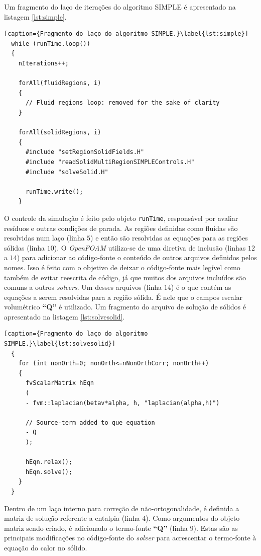Um fragmento do laço de iterações do algoritmo SIMPLE é apresentado na listagem \ref{lst:simple}.

\begin{lstlisting}[caption={Fragmento do laço do algoritmo SIMPLE.}\label{lst:simple}]
  while (runTime.loop())
  {
    nIterations++;

    forAll(fluidRegions, i)
    {
      // Fluid regions loop: removed for the sake of clarity
    }
    
    forAll(solidRegions, i)
    {
      #include "setRegionSolidFields.H"
      #include "readSolidMultiRegionSIMPLEControls.H"
      #include "solveSolid.H"
      
      runTime.write();
    }
\end{lstlisting}

O controle da simulação é feito pelo objeto \texttt{runTime}, responsável por avaliar resíduos
e outras condições de parada. As regiões definidas como fluidas são resolvidas num laço (linha $5$)
e então são resolvidas as equações para as regiões sólidas (linha $10$). O \textit{OpenFOAM} utiliza-se
de uma diretiva de inclusão (linhas $12$ a $14$) para adicionar ao código-fonte o conteúdo de outros
arquivos definidos pelos nomes. Isso é feito com o objetivo de deixar o código-fonte mais legível como
também de evitar reescrita de código, já que muitos dos arquivos incluídos são comuns a outros
\textit{solvers}. Um desses arquivos (linha $14$) é o que contém as equações a serem resolvidas para
a região sólida. É nele que o campos escalar volumétrico \textbf{``Q''} é utilizado. Um fragmento
do arquivo de solução de sólidos é apresentado na listagem \ref{lst:solvesolid}.

\begin{lstlisting}[caption={Fragmento do laço do algoritmo SIMPLE.}\label{lst:solvesolid}]
  {
    for (int nonOrth=0; nonOrth<=nNonOrthCorr; nonOrth++)
    {
      fvScalarMatrix hEqn
      (
      - fvm::laplacian(betav*alpha, h, "laplacian(alpha,h)")

      // Source-term added to que equation
      - Q
      );

      hEqn.relax();
      hEqn.solve();
    }
  }
\end{lstlisting}

Dentro de um laço interno para correção de não-ortogonalidade, é definida a matriz de solução
referente a entalpia (linha $4$). Como argumentos do objeto matriz sendo criado, é adicionado
o termo-fonte \textbf{``Q''} (linha $9$). Estas são as principais
modificações no código-fonte do \textit{solver} para
acrescentar o termo-fonte à equação do calor no sólido.

